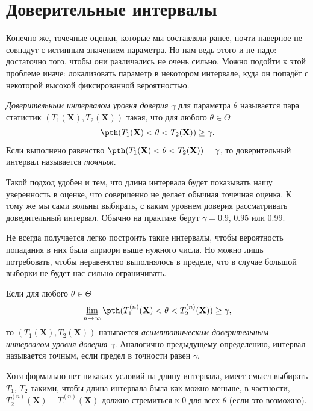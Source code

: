 \section{Доверительные интервалы}

Конечно же, точечные оценки, которые мы составляли ранее, почти наверное не совпадут с истинным значением параметра. Но нам ведь этого и не надо: достаточно того, чтобы они различались не очень сильно. Можно подойти к этой проблеме иначе: локализовать параметр в некотором интервале, куда он попадёт с некоторой высокой фиксированной вероятностью.

\begin{definition}
    \textit{Доверительным интервалом уровня доверия $\gamma$} для параметра $\theta$ называется пара статистик $(T_1(\mathbf X), T_2(\mathbf X))$ такая, что для любого $\theta \in \Theta$
    \[
    \pth (T_1(\mathbf X) < \theta < T_2(\mathbf X)) \ge \gamma.
    \]
    Если выполнено равенство $\pth (T_1(\mathbf X) < \theta < T_2(\mathbf X)) = \gamma$, то доверительный интервал называется \textit{точным}.
\end{definition}

Такой подход удобен и тем, что длина интервала будет показывать нашу уверенность в оценке, что совершенно не делает обычная точечная оценка. К тому же мы сами вольны выбирать, с каким уровнем доверия рассматривать доверительный интервал. Обычно на практике берут $\gamma = 0.9$, $0.95$ или $0.99$.

Не всегда получается легко построить такие интервалы, чтобы вероятность попадания в них была априори выше нужного числа. Но можно лишь потребовать, чтобы неравенство выполнялось в пределе, что в случае большой выборки не будет нас сильно ограничивать.

\begin{definition}
    Если для любого $\theta \in \Theta$
    \[
    \varliminf_{n \to \infty} \pth (T_1^{(n)}(\mathbf X) < \theta < T_2^{(n)}(\mathbf X)) \ge \gamma,
    \]
то $(T_1(\mathbf X), T_2(\mathbf X))$ называется \textit{асимптотическим доверительным интервалом уровня доверия $\gamma$}. Аналогично предыдущему определению, интервал называется $\textit{точным}$, если предел в точности равен $\gamma$.
\end{definition}

Хотя формально нет никаких условий на длину интервала, имеет смысл выбирать $T_1$, $T_2$ такими, чтобы длина интервала была как можно меньше, в частности, $T_2^{(n)}(\mathbf X) - T_1^{(n)}(\mathbf X)$ должно стремиться к 0 для всех $\theta$ (если это возможно).

